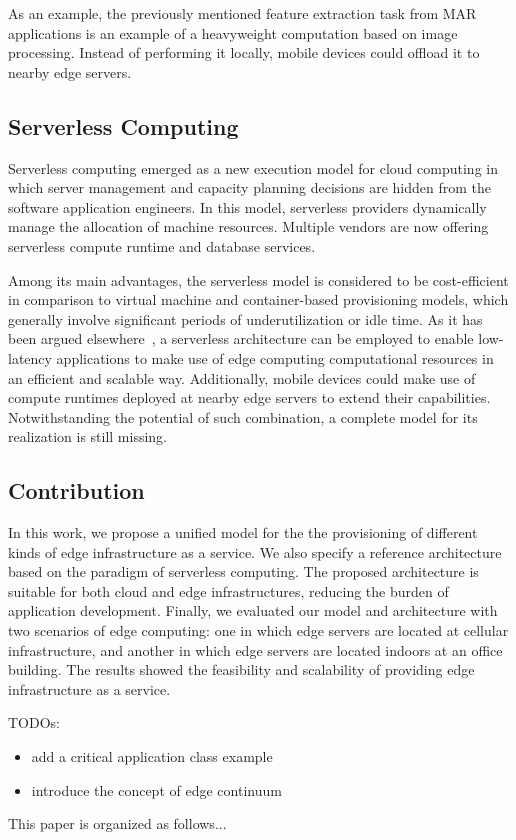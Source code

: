 As an example, the previously mentioned feature extraction task from MAR applications is an example of a heavyweight computation based on image processing. Instead of performing it locally, mobile devices could offload it to nearby edge servers. 

\subsection{Serverless Computing}

Serverless computing emerged as a new execution model for cloud computing in which server management and capacity planning decisions are hidden from the software application engineers. In this model, serverless providers dynamically manage the allocation of machine resources. Multiple vendors are now offering serverless compute runtime and database services. 

Among its main advantages, the serverless model is considered to be cost-efficient in comparison to virtual machine and container-based provisioning models, which generally involve significant periods of underutilization or idle time. As it has been argued elsewhere~\cite{ESOCC'17}, a serverless architecture can be employed to enable low-latency applications to make use of edge computing computational resources in an efficient and scalable way. Additionally, mobile devices could make use of compute runtimes deployed at nearby edge servers to extend their capabilities. Notwithstanding the potential of such combination, a complete model for its realization is still missing. 

\subsection{Contribution}

In this work, we propose a unified model for the the provisioning of different kinds of edge infrastructure as a service. We also specify a reference architecture based on the paradigm of serverless computing. The proposed architecture is suitable for both cloud and edge infrastructures, reducing the burden of application development. Finally, we evaluated our model and architecture with two scenarios of edge computing: one in which edge servers are located at cellular infrastructure, and another in which edge servers are located indoors at an office building. The results showed the feasibility and scalability of providing edge infrastructure as a service.

TODOs: 
\begin{itemize}

\item add a critical application class example
\item introduce the concept of edge continuum

\end{itemize}

This paper is organized as follows...




